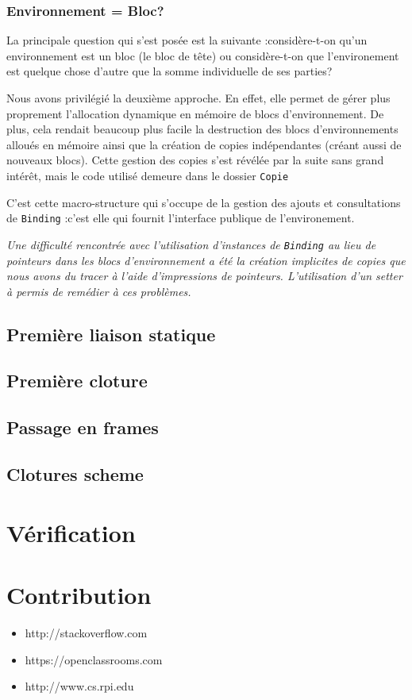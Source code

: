 \documentclass[a4paper,11pt]{article}
\newcommand{\dbend}{{\manual\char127}}
\newenvironment{attention}%
{\description\item[\dbend]\sl}%
{\enddescription}
\begin{document}
\subsubsection{Environnement = Bloc?}

La principale question qui s'est posée est la suivante :considère-t-on qu'un
environnement est un bloc (le bloc de \og tête\fg) ou considère-t-on que
l'environement est quelque chose d'autre que la somme individuelle de ses
parties?

Nous avons privilégié la deuxième approche. En effet, elle permet de gérer plus
proprement l'allocation dynamique en mémoire de blocs d’environnement. De plus,
cela rendait beaucoup plus facile la destruction des blocs d’environnements
alloués en mémoire ainsi que la création de copies indépendantes (créant aussi
de nouveaux blocs). Cette gestion des copies s'est révélée par la suite sans
grand intérêt, mais le code utilisé demeure dans le dossier \texttt{Copie}

C'est cette macro-structure qui s'occupe de la gestion des ajouts et
consultations de \texttt{Binding} :c'est elle qui fournit l'interface publique
de l'environement.

\begin{attention}
  Une difficulté rencontrée avec l'utilisation d'instances de \texttt{Binding}
  au lieu de pointeurs dans les blocs d’environnement a été la création
  implicites de copies que nous avons du tracer à l'aide d'impressions de
  pointeurs. L'utilisation d'un setter à permis de remédier à ces problèmes.
\end{attention}

\subsection{Première liaison statique}

\subsection{Première cloture}

\subsection{Passage en frames}

\subsection{Clotures scheme}

\section{Vérification}

\section{Contribution}




\begin{itemize}
\item http://stackoverflow.com
\item https://openclassrooms.com
\item http://www.cs.rpi.edu
\end{itemize}
\end{document}
